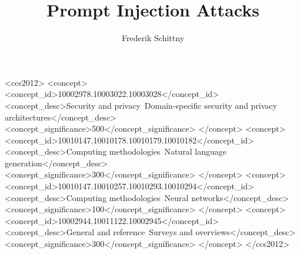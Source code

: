 
\usepackage{cleveref}

\usepackage{makecell}
\usepackage{multicol}
\usepackage{multirow}

\usepackage[htt]{hyphenat}

\usepackage{amsmath}

\acmDOI{}
\acmISBN{}

\received[revised]{}
\received[accepted]{}

\title{Prompt Injection Attacks}

\author{Frederik Schittny}


\begin{CCSXML}
<ccs2012>
   <concept>
       <concept_id>10002978.10003022.10003028</concept_id>
       <concept_desc>Security and privacy~Domain-specific security and privacy architectures</concept_desc>
       <concept_significance>500</concept_significance>
       </concept>
   <concept>
       <concept_id>10010147.10010178.10010179.10010182</concept_id>
       <concept_desc>Computing methodologies~Natural language generation</concept_desc>
       <concept_significance>300</concept_significance>
       </concept>
   <concept>
       <concept_id>10010147.10010257.10010293.10010294</concept_id>
       <concept_desc>Computing methodologies~Neural networks</concept_desc>
       <concept_significance>100</concept_significance>
       </concept>
   <concept>
       <concept_id>10002944.10011122.10002945</concept_id>
       <concept_desc>General and reference~Surveys and overviews</concept_desc>
       <concept_significance>300</concept_significance>
       </concept>
 </ccs2012>
\end{CCSXML}


